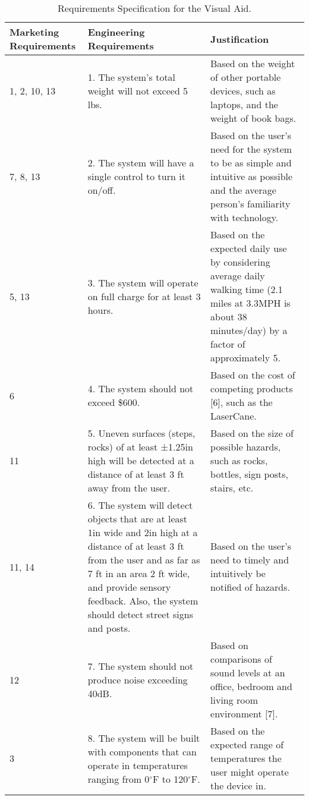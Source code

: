 \begin{table}
\caption{Requirements Specification for the Visual Aid.}
\label{table:caseStudyRequirements}
\begin{tabular}{|m{3cm}|m{3cm}|m{3cm}|} \hline
\textbf{Marketing Requirements} & \textbf{Engineering Requirements} & \textbf{Justification} \\ \hline

1, 2, 10, 13 & 
		1. The system's total weight will not exceed 5 lbs. & 
		Based on the weight of other portable devices, such as
		laptops, and the weight of book bags. \\ \hline
		
7, 8, 13 & 
		2. The system will have a single control to turn it on/off.  & 
		Based on the user's need for the system to be as simple
		and intuitive as possible and the average person's familiarity with
		technology. \\ \hline
		
5, 13 & 
		3. The system will operate on full charge for at least 3 hours. &
		Based on the expected daily use by considering average
		daily walking time (2.1 miles at 3.3MPH is about 38 minutes/day) by a factor of
		approximately 5. \\ \hline
		
6 & 
		4. The system should not exceed \$600.		&
		Based on the cost of competing products {[}6{]}, such
		as the LaserCane. \\ \hline
		
11 & 
		5. Uneven surfaces (steps, rocks) of at least ±1.25in high will be
		  detected at a distance of at least 3 ft away from the user. &
		Based on the size of possible hazards, such as rocks,
		bottles, sign posts, stairs, etc. \\ \hline
		
11, 14 & 
		6. The system will detect objects that are at least 1in wide and 2in high
		  at a distance of at least 3 ft from the user and as far as 7 ft in an
		  area 2 ft wide, and provide sensory feedback. Also, the system should
		  detect street signs and posts.		&
		Based on the user's need to timely and intuitively be
		notified of hazards. \\ \hline
		
		
12 &
		7. The system should not produce noise exceeding 40dB.	&
		Based on comparisons of sound levels at an office,
		bedroom and living room environment {[}7{]}. \\ \hline

3 & 
		8.  The system will be built with components that can operate in
		  temperatures ranging from 0$^\circ$F to 120$^\circ$F.		&
		Based on the expected range of temperatures the user
		might operate the device in. \\	\hline


\end{tabular}
\end{table}
